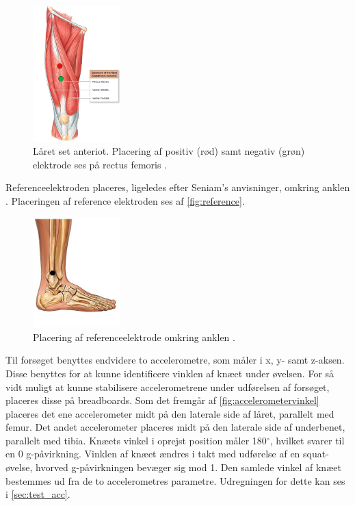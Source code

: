\begin{figure}[H]
\centering
\includegraphics[width=0.3\textwidth]{figures/laarmuskel.png}
\caption{Låret set anteriot. Placering af positiv (rød) samt negativ (grøn) elektrode ses på rectus femoris \citep{martini2012}.}
\label{fig:laarmuskler}
\end{figure}

Referenceelektroden placeres, ligeledes efter Seniam's anvisninger, omkring anklen \citep{seniam2016}. Placeringen af reference elektroden ses af \autoref{fig:reference}.

\begin{figure}[H]
\centering
\includegraphics[width=0.3\textwidth]{figures/reference}
\caption{Placering af referenceelektrode omkring anklen \citep{ankle2016}.}
\label{fig:reference}
\end{figure}

Til forsøget benyttes endvidere to accelerometre, som måler i x, y- samt z-aksen. Disse benyttes for at kunne identificere vinklen af knæet under øvelsen. For så vidt muligt at kunne stabilisere accelerometrene under udførelsen af forsøget, placeres disse på breadboards. 
Som det fremgår af \autoref{fig:accelerometervinkel} placeres det ene accelerometer midt på den laterale side af låret, parallelt med femur. Det andet accelerometer placeres midt på den laterale side af underbenet, parallelt med tibia. Knæets vinkel i oprejst position måler 180$^{\circ}$, hvilket svarer til en 0 g-påvirkning. Vinklen af knæet ændres i takt med udførelse af en squat-øvelse, hvorved g-påvirkningen bevæger sig mod 1. Den samlede vinkel af knæet bestemmes ud fra de to accelerometres parametre. Udregningen for dette kan ses i \autoref{sec:test_acc}.

